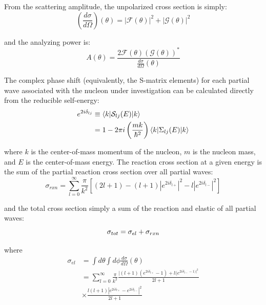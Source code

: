 \noindent
From the scattering amplitude, the unpolarized cross section is simply:
\begin{equation}
    \left(\frac{d\sigma}{d\Omega}\right)(\theta) = |\mathcal{F}(\theta)|^{2}
    +|\mathcal{G}(\theta)|^{2}
\end{equation}

\noindent
and the analyzing power is:
\begin{equation}
    A(\theta) = \frac{2\mathcal{F}(\theta)(\mathcal{G}(\theta))^{*}}
    {\frac{d\sigma}{d\Omega}(\theta)}
\end{equation}

\noindent
The complex phase shift (equivalently, the S-matrix elements) for each partial wave associated
with the nucleon under investigation can be
calculated directly from the reducible self-energy:
\begin{equation}
    \begin{split}
        e^{2i\delta_{lj}} & \equiv \braket{k|\mathcal{S}_{lj}(E)|k}\\
        & = 1 - 2\pi i \left(\frac{mk}{\hbar^{2}}\right) \braket{k|\Sigma_{lj}(E)|k}
    \end{split}
\end{equation}

\noindent
where $k$ is the center-of-mass momentum of the nucleon, $m$ is the nucleon mass, and $E$ is the
center-of-mass energy. The reaction cross section at a given energy is the sum of the partial
reaction cross section over all partial waves:
\begin{equation}
    \sigma_{rxn} = \sum^{\infty}_{l=0}\frac{\pi}{k^{2}}
    \left[(2l+1)-(l+1)|e^{2i\delta_{l+}}|^{2}-l|e^{2i\delta_{l-}}|^{2}\right]
\end{equation}

\noindent
and the total cross section simply a sum of the reaction and elastic of all partial waves:
\begin{equation}
    \sigma_{tot} = \sigma_{el} + \sigma_{rxn}\\
\end{equation}

\noindent
where
\begin{equation}
    \begin{split}
        \sigma_{el} & = \int d\theta \int d\phi \frac{d\sigma}{d\Omega}(\theta)\\
        & = \sum^{\infty}_{l=0}\frac{\pi}{k^{2}}
        \frac{|(l+1)(e^{2i\delta_{l+}}-1)+l(e^{2i\delta_{l-}-1)|^{2}}}{2l+1}\\
        & \times \frac{l(l+1)|e^{2i\delta_{l+}}-e^{2i\delta_{l-}}|^{2}}{2l+1}
    \end{split}
\end{equation}

